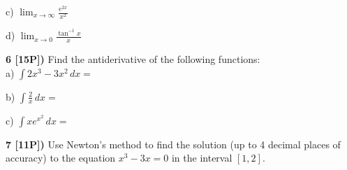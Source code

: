\documentclass[12pt]{article}
\begin{document}
\vspace{.5in}

c) $\displaystyle{\lim_{x\to \infty}  \frac{e^{2x}}{x^2}}$

\vspace{.5in}


d)  $\displaystyle{\lim_{x\to 0}  \frac{\tan^{-1} x}{x}}$

\vspace{2.5in}



{\bf 6 [15P])}  Find the antiderivative of the following 
functions:
\\ %
a) $\displaystyle{\int {2x^3 - 3x^2} \, dx 
=}$

\vspace{.4in}

b) $\displaystyle{\int \frac{2}{x} \, dx=}$

\vspace{.4in}

c) $\displaystyle{\int  xe^{x^2}\, dx =}$
\\ %



\vspace{3in}



\vspace{2in}


{\bf 7 [11P])} Use Newton's method to find the solution (up to 4 decimal places 
of accuracy) to the equation $\displaystyle{x^3-3x= 0}$ in
the interval $\displaystyle{[1,2]}$.



\vspace{3in}

  
\end{document}
